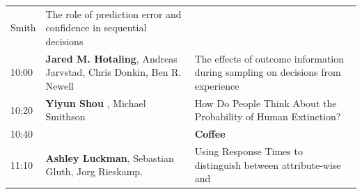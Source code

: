 \documentclass[]{article}
\begin{document}
\begin{longtable}[]{@{}lll@{}}
\begin{minipage}[t]{0.38\columnwidth}
Smith\strut
\end{minipage} & \begin{minipage}[t]{0.51\columnwidth}\raggedright\strut
The role of prediction error and confidence in sequential
decisions\strut
\end{minipage}\tabularnewline
\begin{minipage}[t]{0.03\columnwidth}\raggedright\strut
10:00\strut
\end{minipage} & \begin{minipage}[t]{0.38\columnwidth}\raggedright\strut
\textbf{Jared M. Hotaling}, Andreas Jarvstad, Chris Donkin, Ben R.
Newell\strut
\end{minipage} & \begin{minipage}[t]{0.51\columnwidth}\raggedright\strut
The effects of outcome information during sampling on decisions from
experience\strut
\end{minipage}\tabularnewline
\begin{minipage}[t]{0.03\columnwidth}\raggedright\strut
10:20\strut
\end{minipage} & \begin{minipage}[t]{0.38\columnwidth}\raggedright\strut
\textbf{Yiyun Shou} , Michael Smithson\strut
\end{minipage} & \begin{minipage}[t]{0.51\columnwidth}\raggedright\strut
How Do People Think About the Probability of Human Extinction?\strut
\end{minipage}\tabularnewline
\begin{minipage}[t]{0.03\columnwidth}\raggedright\strut
10:40\strut
\end{minipage} & \begin{minipage}[t]{0.38\columnwidth}\raggedright\strut
\strut
\end{minipage} & \begin{minipage}[t]{0.51\columnwidth}\raggedright\strut
\textbf{Coffee}\strut
\end{minipage}\tabularnewline
\begin{minipage}[t]{0.03\columnwidth}\raggedright\strut
11:10\strut
\end{minipage} & \begin{minipage}[t]{0.38\columnwidth}\raggedright\strut
\textbf{Ashley Luckman}, Sebastian Gluth, Jorg Rieskamp.\strut
\end{minipage} & \begin{minipage}[t]{0.51\columnwidth}\raggedright\strut
Using Response Times to distinguish between attribute-wise and

\end{minipage}
\end{longtable}
\end{document}
